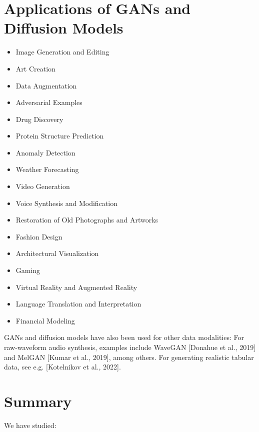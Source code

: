 \documentclass[10pt]{article}
\begin{document}
\section*{Applications of GANs and Diffusion Models}
\begin{itemize}
  \item Image Generation and Editing

  \item Art Creation

  \item Data Augmentation

  \item Adversarial Examples

  \item Drug Discovery

  \item Protein Structure Prediction

  \item Anomaly Detection

  \item Weather Forecasting

  \item Video Generation

  \item Voice Synthesis and Modification

  \item Restoration of Old Photographs and Artworks

  \item Fashion Design

  \item Architectural Visualization

  \item Gaming

  \item Virtual Reality and Augmented Reality

  \item Language Translation and Interpretation

  \item Financial Modeling

\end{itemize}

GANs and diffusion models have also been used for other data modalities: For raw-waveform audio synthesis, examples include WaveGAN [Donahue et al., 2019] and MelGAN [Kumar et al., 2019], among others. For generating realistic tabular data, see e.g. [Kotelnikov et al., 2022].

\section*{Summary}
We have studied:
\end{document}
